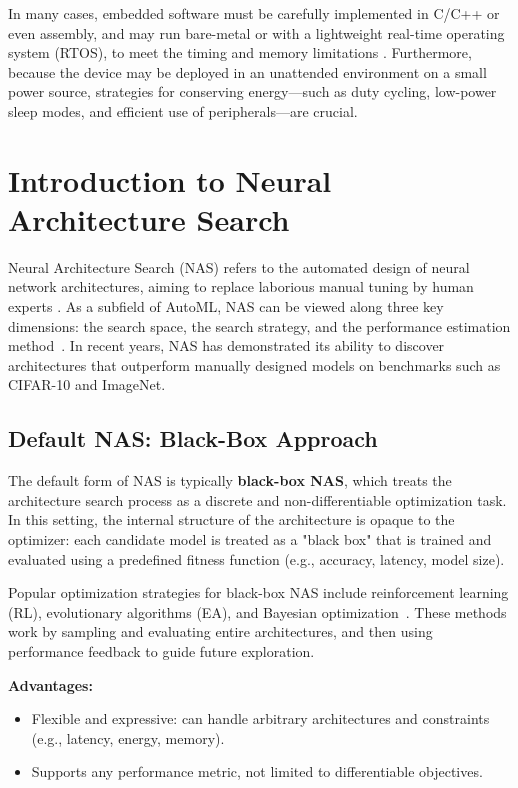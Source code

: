In many cases, embedded software must be carefully implemented in C/C++ or even assembly, and may run bare-metal or with a lightweight real-time operating system (RTOS), to meet the timing and memory limitations \cite{techtarget_embedded_system}. Furthermore, because the device may be deployed in an unattended environment on a small power source, strategies for conserving energy---such as duty cycling, low-power sleep modes, and efficient use of peripherals---are crucial.

\clearpage








\section{Introduction to Neural Architecture Search}
\label{chap:nas}
Neural Architecture Search (NAS) refers to the automated design of neural network architectures, aiming to replace laborious manual tuning by human experts \cite{elsken2019neural}. As a subfield of AutoML, NAS can be viewed along three key dimensions: the search space, the search strategy, and the performance estimation method~\cite{elsken2019neural}. In recent years, NAS has demonstrated its ability to discover architectures that outperform manually designed models on benchmarks such as CIFAR-10 and ImageNet.

\subsection{Default NAS: Black-Box Approach}
The default form of NAS is typically \textbf{black-box NAS}, which treats the architecture search process as a discrete and non-differentiable optimization task. In this setting, the internal structure of the architecture is opaque to the optimizer: each candidate model is treated as a "black box" that is trained and evaluated using a predefined fitness function (e.g., accuracy, latency, model size).

Popular optimization strategies for black-box NAS include reinforcement learning (RL), evolutionary algorithms (EA), and Bayesian optimization~\cite{qiu2023shortest}. These methods work by sampling and evaluating entire architectures, and then using performance feedback to guide future exploration.

\textbf{Advantages:}
\begin{itemize}
    \item Flexible and expressive: can handle arbitrary architectures and constraints (e.g., latency, energy, memory).
    \item Supports any performance metric, not limited to differentiable objectives.
\end{itemize}

